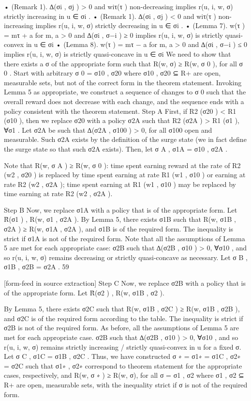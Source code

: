 \documentclass[10pt]{article}
\begin{document}
\begin{ReviewVerbatim}
• (Remark 1). ∆(σi , σj ) > 0 and wiτ(τ ) non-decreasing implies r(u, i, w, σ) strictly increasing in
u ∈ σi .
• (Remark 1). ∆(σi , σj ) < 0 and wiτ(τ ) non-increasing implies r(u, i, w, σ) strictly decreasing in
u ∈ σi .
• (Lemma 7). w(τ ) = mτ + a for m, a > 0 and ∆(σi , σ−i ) ≥ 0 implies r(u, i, w, σ) is strictly
quasi-convex in u ∈ σi
• (Lemma 8). w(τ ) = mτ − a for m, a > 0 and ∆(σi , σ−i ) ≤ 0 implies r(u, i, w, σ) is strictly
quasi-concave in u ∈ σi
We need to show that there exists a σ of the appropriate form such that R(w, σ) ≥ R(w, σ 0 ),
for all σ 0 .
Start with arbitrary σ 0 = {σ10 , σ20 } where σ10 , σ20 ⊆ R+ are open, measurable sets, but not of the
correct form in the theorem statement. Invoking Lemma 5 as appropriate, we construct a sequence
of changes to σ 0 such that the overall reward does not decrease with each change, and the sequence
ends with a policy consistent with the theorem statement.
Step A First, if R2 (σ20 ) < R1 (σ10 ), then we replace σ20 with a policy σ2A such that R2 (σ2A ) >
R1 (σ1 ), ∀σ1 .
Let σ2A be such that ∆(σ2A , σ100 ) > 0, for all σ100 open and measurable. Such σ2A exists by the
definition of the surge state (we in fact define the surge state so that such σ2A exists).
Then, let σ A , {σ1A = σ10 , σ2A }.

Note that R(w, σ A ) ≥ R(w, σ 0 ): time spent earning reward at the rate of R2 (w2 , σ20 ) is replaced
by time spent earning at rate R1 (w1 , σ10 ) or earning at rate R2 (w2 , σ2A ); time spent earning
at R1 (w1 , σ10 ) may be replaced by time earning at rate R2 (w2 , σ2A ).

Step B Now, we replace σ1A with a policy that is of the appropriate form.
Let R̂(σ1 ) , R(w, {σ1 , σ2A }). By Lemma 5, there exists σ1B such that R(w, {σ1B , σ2A }) ≥
R(w, {σ1A , σ2A }), and σ1B is of the required form. The inequality is strict if σ1A is not of the
required form.
Note that all the assumptions of Lemma 5 are met for each appropriate case: σ2B such
that ∆(σ2B , σ10 ) > 0, ∀σ10 , and so r(u, i, w, σ) remains decreasing or strictly quasi-concave as
necessary.
Let σ B , {σ1B , σ2B = σ2A }.
59


[form-feed in source extraction]
Step C Now, we replace σ2B with a policy that is of the appropriate form.
Let R̂(σ2 ) , R(w, {σ1B , σ2 }).

By Lemma 5, there exists σ2C such that R(w, {σ1B , σ2C }) ≥ R(w, {σ1B , σ2B }), and σ2C is of the
required form according to the table. The inequality is strict if σ2B is not of the required form.
As before, all the assumptions of Lemma 5 are met for each appropriate case. σ2B such that
∆(σ2B , σ10 ) > 0, ∀σ10 , and so r(u, i, w, σ) remains strictly increasing / strictly quasi-convex in
u for a fixed σ.
Let σ C , {σ1C = σ1B , σ2C }.
Thus, we have constructed σ ∗ = {σ1∗ = σ1C , σ2∗ = σ2C } such that σ1∗ , σ2∗ correspond to theorem
statement for the appropriate cases, respectively, and R(w, σ ∗ ) ≥ R(w, σ), for all σ = {σ1 , σ2 }
where σ1 , σ2 ⊆ R+ are open, measurable sets, with the inequality strict if σ is not of the required
form.
\end{ReviewVerbatim}
\end{document}
